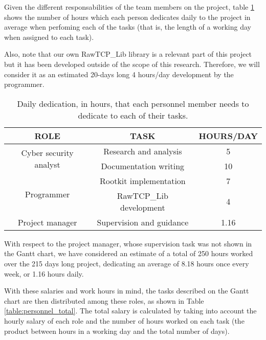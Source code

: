 Given the different responsabilities of the team members on the project, table \ref{table:hours_personnel} shows the number of hours which each person dedicates daily  to the project in average when perfoming each of the tasks (that is, the length of a working day when assigned to each task). 

Also, note that our own RawTCP\_Lib library is a relevant part of this project but it has been developed outside of the scope of this research. Therefore, we will consider it as an estimated 20-days long 4 hours/day development by the programmer.

\begin{table}[htbp]
\begin{tabular}{|c|c|c|}
\hline
\textbf{ROLE} & \textbf{TASK} & \textbf{HOURS/DAY}\\
\hline
\hline
\multirow{2}{*}{Cyber security analyst} & \multicolumn{1}{c|}{Research and analysis} & \multicolumn{1}{c|}{5}\\
\cline{2-3}
& \multicolumn{1}{c|}{Documentation writing} & \multicolumn{1}{c|}{10} \\
\hline
\multirow{2}{*}{Programmer} & \multicolumn{1}{c|}{Rootkit implementation} & \multicolumn{1}{c|}{7} \\
\cline{2-3}
& \multicolumn{1}{c|}{RawTCP\_Lib development} & \multicolumn{1}{c|}{4} \\
\hline
Project manager & Supervision and guidance & 1.16 \\ 
\hline
\end{tabular}
\caption{Daily dedication, in hours, that each personnel member needs to dedicate to each of their tasks.}
\label{table:hours_personnel}
\end{table}

With respect to the project manager, whose supervision task was not shown in the Gantt chart, we have considered an estimate of a total of 250 hours worked over the 215 days long project, dedicating an average of 8.18 hours once every week, or 1.16 hours daily.

With these salaries and work hours in mind, the tasks described on the Gantt chart are then distributed among these roles, as shown in Table \ref{table:personnel_total}. The total salary is calculated by taking into account the hourly salary of each role and the number of hours worked on each task (the product between hours in a working day and the total number of days).

